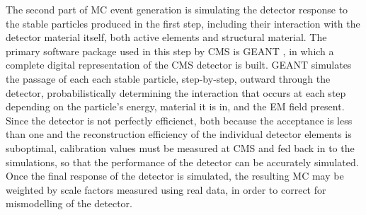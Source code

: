\indent The second part of MC event generation is simulating the detector response to the stable particles produced in the first step, including their interaction with the detector material itself, both active elements and structural material. The primary software package used in this step by CMS is GEANT \cite{documents:998155}, in which a complete digital representation of the CMS detector is built. GEANT simulates the passage of each each stable particle, step-by-step, outward through the detector, probabilistically determining the interaction that occurs at each step depending on the particle's energy,  material it is in, and the EM field present. Since the detector is not perfectly efficienct, both because the acceptance is less than one and the reconstruction efficiency of the individual detector elements is suboptimal, calibration values must be measured at CMS and fed back in to the simulations, so that the performance of the detector can be accurately simulated. Once the final response of the detector is simulated, the resulting MC may be weighted by scale factors measured using real data, in order to correct for mismodelling of the detector.


